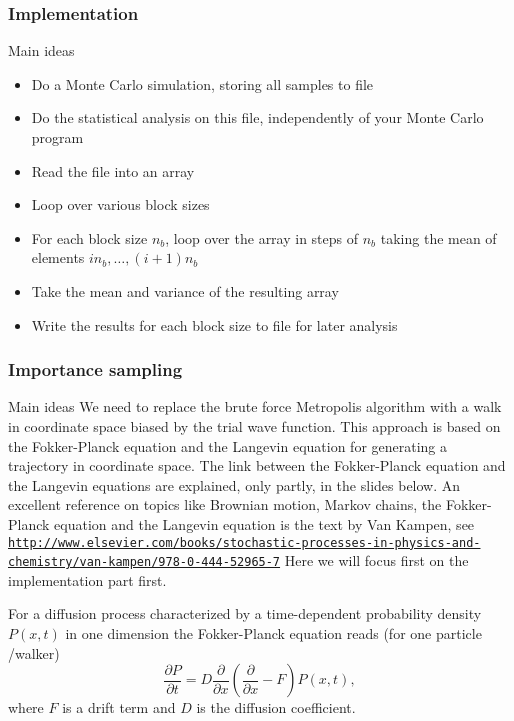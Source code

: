 \documentclass{beamer}
\begin{document}
\begin{frame}
\frametitle{Implementation}

\begin{block}{Main ideas }
\begin{itemize}
    \item Do a Monte Carlo simulation, storing all samples to file

    \item Do the statistical analysis on this file, independently of your Monte Carlo program

    \item Read the file into an array

    \item Loop over various block sizes

    \item For each block size $n_b$, loop over the array in steps of $n_b$ taking the mean of elements $i n_b,\ldots,(i+1) n_b$

    \item Take the mean and variance of the resulting array

    \item Write the results for each block size to file for later
      analysis
\end{itemize}

\noindent
\end{block}
\end{frame}

\begin{frame}
\frametitle{Importance sampling}

\begin{block}{Main ideas }
We need to replace the brute force
Metropolis algorithm with a walk in coordinate space biased by the trial wave function.
This approach is based on the Fokker-Planck equation and the Langevin equation for generating a trajectory in coordinate space.  The link between the Fokker-Planck equation and the Langevin equations are explained, only partly, in the slides below.
An excellent reference on topics like Brownian motion, Markov chains, the Fokker-Planck equation and the Langevin equation is the text by  Van Kampen, see \href{{http://www.elsevier.com/books/stochastic-processes-in-physics-and-chemistry/van-kampen/978-0-444-52965-7}}{\nolinkurl{http://www.elsevier.com/books/stochastic-processes-in-physics-and-chemistry/van-kampen/978-0-444-52965-7}}
Here we will focus first on the implementation part first.

For a diffusion process characterized by a time-dependent probability density $P(x,t)$ in one dimension the Fokker-Planck
equation reads (for one particle /walker) 
\[
   \frac{\partial P}{\partial t} = D\frac{\partial }{\partial x}\left(\frac{\partial }{\partial x} -F\right)P(x,t),
\]
where $F$ is a drift term and $D$ is the diffusion coefficient. 

\end{block}
\end{frame}
\end{document}
